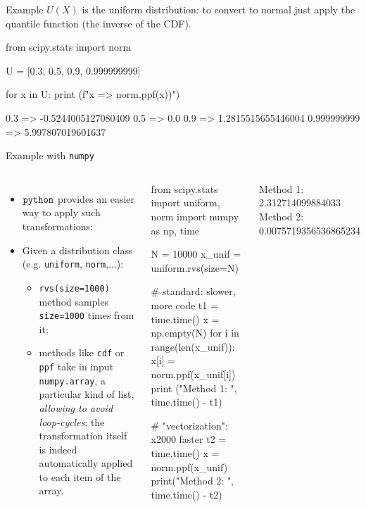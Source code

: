 \documentclass{beamer}
\begin{document}
\begin{frame}[fragile]{Example}
  $U(X)$ is the uniform distribution: to convert to normal just apply the quantile function (the inverse of the CDF).
  \begin{ipython}
from scipy.stats import norm

U = [0.3, 0.5, 0.9, 0.999999999]

for x in U:
    print (f"{x} => {norm.ppf(x))}")
  \end{ipython}
\begin{ioutput}
0.3 => -0.5244005127080409
0.5 => 0.0
0.9 => 1.2815515655446004
0.999999999 => 5.997807019601637
\end{ioutput}
\end{frame}
	
\begin{frame}[fragile]{Example with \texttt{numpy}}
  \begin{columns}
    \begin{itemize}	
    \item $\tt{python}$ provides an easier way to apply such transformations:
    \item  Given a distribution class (e.g. \texttt{uniform}, \texttt{norm},...):
      \begin{itemize}
      \item \texttt{rvs(size=1000)} method samples \texttt{size=1000} times from it;
      \item methods like \texttt{cdf} or \texttt{ppf} take in input \texttt{numpy.array},  a particular kind of list, \emph{allowing to avoid loop-cycles}: the transformation itself is indeed automatically applied to each item of the array.
      \end{itemize}
    \end{itemize}
\tiny{
    \begin{ipython}
from scipy.stats import uniform, norm
import numpy as np, time

N = 10000
x_unif = uniform.rvs(size=N)

# standard: slower, more code
t1 = time.time()
x = np.empty(N)
for i in range(len(x_unif)):
  x[i] = norm.ppf(x_unif[i])
print ("Method 1: ", time.time() - t1)

# "vectorization": x2000 faster
t2 = time.time()
x = norm.ppf(x_unif)
print("Method 2: ", time.time() - t2)      
\end{ipython}
\begin{ioutput}
Method 1: 2.312714099884033
Method 2: 0.0075719356536865234
\end{ioutput}
    }
    \end{columns}
\end{frame}
\end{document}
